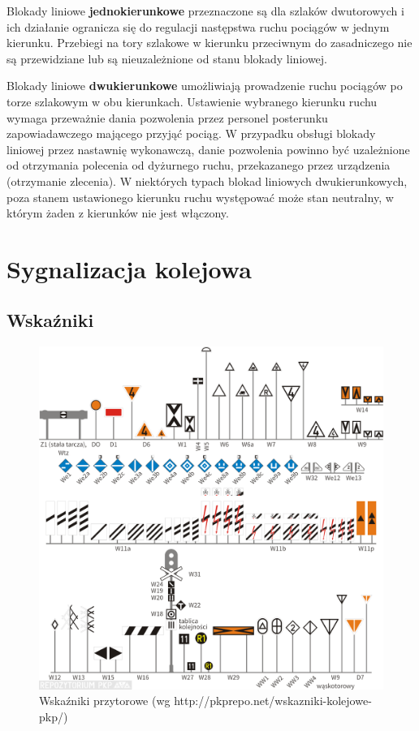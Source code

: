Blokady liniowe \textbf{jednokierunkowe} przeznaczone są dla szlaków dwutorowych i ich działanie ogranicza się do regulacji następstwa ruchu pociągów w jednym kierunku. Przebiegi na tory szlakowe w kierunku przeciwnym do zasadniczego nie są przewidziane lub są nieuzależnione od stanu blokady liniowej.

Blokady liniowe \textbf{dwukierunkowe} umożliwiają prowadzenie ruchu pociągów po torze szlakowym w obu kierunkach. Ustawienie wybranego kierunku ruchu wymaga przeważnie dania pozwolenia przez personel posterunku zapowiadawczego mającego przyjąć pociąg. W przypadku obsługi blokady liniowej przez nastawnię wykonawczą, danie pozwolenia powinno być uzależnione od otrzymania polecenia od dyżurnego ruchu, przekazanego przez urządzenia (otrzymanie zlecenia). W niektórych typach blokad liniowych dwukierunkowych, poza stanem ustawionego kierunku ruchu występować może stan neutralny, w którym żaden z kierunków nie jest włączony.

 


\chapter{Sygnalizacja kolejowa}

\section{Wskaźniki}

\begin{center}
	\begin{figure}
		\includegraphics[width=16cm]{skryptkierownik-img/skryptkierownik-img003.png}
		\caption{Wskaźniki przytorowe (wg http://pkprepo.net/wskazniki-kolejowe-pkp/)}
		\label{fig:wskazniki}
	\end{figure}
\end{center}

